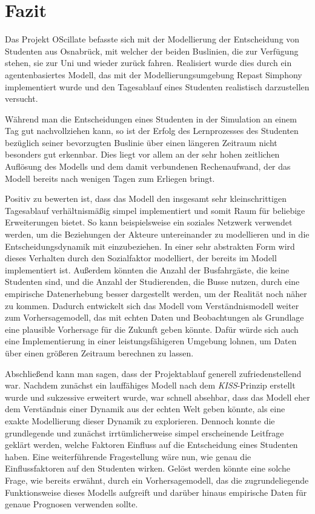 \documentclass[12pt,a4paper]{scrartcl}
\begin{document}
\newpage

\section{Fazit}\label{fazit}
Das Projekt OScillate befasste sich mit der Modellierung der Entscheidung von Studenten aus Osnabrück, mit welcher der beiden Buslinien, die zur Verfügung stehen, sie zur Uni und wieder zurück fahren. Realisiert wurde dies durch ein agentenbasiertes Modell, das mit der Modellierungsumgebung Repast Simphony implementiert wurde und den Tagesablauf eines Studenten realistisch darzustellen versucht. 

Während man die Entscheidungen eines Studenten in der Simulation an einem Tag gut nachvollziehen kann, so ist der Erfolg des Lernprozesses des Studenten bezüglich seiner bevorzugten Buslinie über einen längeren Zeitraum nicht besonders gut erkennbar. Dies liegt vor allem an der sehr hohen zeitlichen Auflösung des Modells und dem damit verbundenen Rechenaufwand, der das Modell bereits nach wenigen Tagen zum Erliegen bringt.

Positiv zu bewerten ist, dass das Modell den insgesamt sehr kleinschrittigen Tagesablauf verhältnismäßig simpel implementiert und somit Raum für beliebige Erweiterungen bietet. So kann beispielsweise ein soziales Netzwerk verwendet werden, um die Beziehungen der Akteure untereinander zu modellieren und in die Entscheidungsdynamik mit einzubeziehen. In einer sehr abstrakten Form wird dieses Verhalten durch den Sozialfaktor modelliert, der bereits im Modell implementiert ist. Außerdem könnten die Anzahl der Busfahrgäste, die keine Studenten sind, und die Anzahl der Studierenden, die Busse nutzen, durch eine empirische Datenerhebung besser dargestellt werden, um der Realität noch näher zu kommen. Dadurch entwickelt sich das Modell vom Verständnismodell weiter zum Vorhersagemodell, das mit echten Daten und Beobachtungen als Grundlage eine plausible Vorhersage für die Zukunft geben könnte. Dafür würde sich auch eine Implementierung in einer leistungsfähigeren Umgebung lohnen, um Daten über einen größeren Zeitraum berechnen zu lassen. 

Abschließend kann man sagen, dass der Projektablauf generell zufriedenstellend war. Nachdem zunächst ein lauffähiges Modell nach dem \textit{KISS}-Prinzip erstellt wurde und sukzessive erweitert wurde, war schnell absehbar, dass das Modell eher dem Verständnis einer Dynamik aus der echten Welt geben könnte, als eine exakte Modellierung dieser Dynamik zu explorieren. Dennoch konnte die grundlegende und zunächst irrtümlicherweise simpel erscheinende Leitfrage geklärt werden, welche Faktoren Einfluss auf die Entscheidung eines Studenten haben.
Eine weiterführende Fragestellung wäre nun, wie genau die Einflussfaktoren auf den Studenten wirken. Gelöst werden könnte eine solche Frage, wie bereits erwähnt, durch ein Vorhersagemodell, das die zugrundeliegende Funktionsweise dieses Modells aufgreift und darüber hinaus empirische Daten für genaue Prognosen verwenden sollte.
\end{document}
